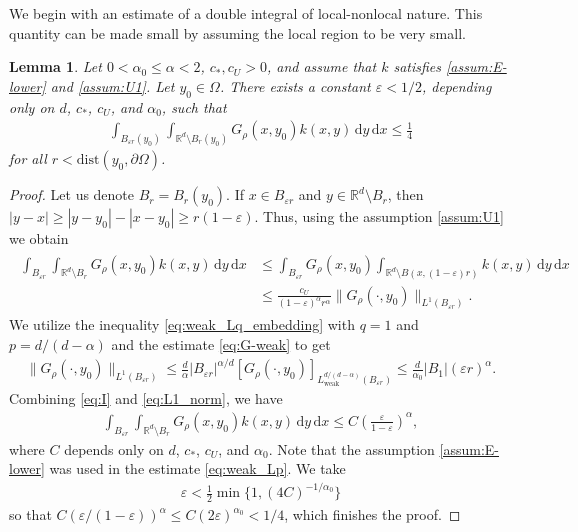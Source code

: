 \documentclass[reqno]{amsart}
\theoremstyle{plain}
\newtheorem{lemma}[theorem]{Lemma}
\theoremstyle{definition}
\numberwithin{equation}{section}
\newcommand{\Rd}{\mathbb{R}^d}
\newcommand{\dx} {\, \mathrm{d}x}
\newcommand{\dy} {\, \mathrm{d}y}
\newcommand{\cl} {c_{\ast}}
\newcommand{\cU} {c_U}
\begin{document}
We begin with an estimate of a double integral of local-nonlocal nature.
This quantity can be made small by assuming the 
local region to be very small.

\begin{lemma} \label{lem:small_term}
Let $0 < \alpha_0 \leq \alpha < 2$, $\cl, \cU > 0$, and assume that $k$ satisfies \eqref{assum:E-lower} and \eqref{assum:U1}. Let $y_0 \in \Omega$. There exists a constant 
$\varepsilon < 1/2$, depending only on $d$, $\cl$, $\cU$, and $\alpha_0$, such that 
\begin{align*}
\int_{B_{\varepsilon r}(y_0)} \int_{\Rd \setminus B_r(y_0)} 
G_{\rho}(x, y_0) k(x,y) \dy \dx \leq \frac{1}{4}
\end{align*}
for all $r < \mathrm{dist}(y_0, \partial \Omega)$.
\end{lemma}

\begin{proof}
Let us denote $B_r = B_r(y_0)$.
If $x \in B_{\varepsilon r}$ and $y \in \Rd \setminus B_r$, then 
$|y-x| \geq | y-y_0 | - | x - y_0 | \geq r (1 - \varepsilon)$.
Thus, using the assumption \eqref{assum:U1} we obtain
\begin{align} \label{eq:I}
\begin{split}
\int_{B_{\varepsilon r}} \int_{\Rd \setminus B_r} G_{\rho}(x,y_0) k(x,y) \dy \dx 
&\leq \int_{B_{\varepsilon r}} G_{\rho}(x, y_0) \int_{\Rd \setminus B(x, (1-\varepsilon)r)} k(x,y) \dy \dx \\
&\leq \frac{\cU}{(1- \varepsilon)^{\alpha} r^{\alpha}} \| G_{\rho}(\cdot, y_0) \|_{L^1 (B_{\varepsilon r})}.
\end{split}
\end{align}
We utilize the inequality \eqref{eq:weak_Lq_embedding} 
with $q = 1$ and $p = d/(d-\alpha)$ and the estimate \eqref{eq:G-weak} to get
\begin{align} \label{eq:L1_norm}
\|G_{\rho}(\cdot, y_0)\|_{L^1(B_{\varepsilon r})} 
\leq \frac{d}{\alpha} | B_{\varepsilon r} |^{\alpha/d} 
[G_{\rho}(\cdot, y_0)]_{L^{d/(d-\alpha)}_\mathrm{weak}(B_{\varepsilon r})}
\leq \frac{d}{\alpha_0} |B_1| (\varepsilon r)^\alpha.
\end{align}
Combining \eqref{eq:I} and \eqref{eq:L1_norm}, we have
\begin{align*}
\int_{B_{\varepsilon r}} \int_{\Rd \setminus B_r} G_{\rho}(x, y_0) k(x,y) \dy \dx 
\leq C \left( \frac{\varepsilon}{1-\varepsilon} \right)^\alpha,
\end{align*}
where $C$ depends only on $d$, $\cl$, $\cU$, and $\alpha_0$. 
Note that the assumption \eqref{assum:E-lower} was used in the estimate \eqref{eq:weak_Lp}. We take
\begin{align*}
\varepsilon < \frac{1}{2} \min \lbrace 1, (4C)^{-1/\alpha_0} \rbrace
\end{align*}
so that $C(\varepsilon / (1-\varepsilon))^\alpha
\leq C (2\varepsilon)^{\alpha_0} < 1/4$, which finishes the proof.
\end{proof}
\end{document}
